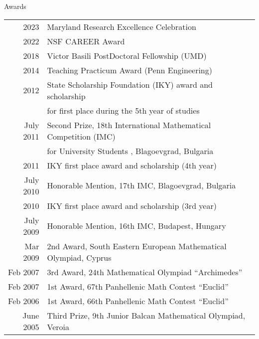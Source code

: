 \documentclass{resume} %
\begin{document}
\begin{rSection}{Awards}

  \begin{longtable}{rl}
  2023 & Maryland Research Excellence Celebration\\
  2022 & NSF CAREER Award \\
  2018 & Victor Basili PostDoctoral Fellowship (UMD)\\
  2014	 & Teaching Practicum Award (Penn Engineering) \\
  2012 & State Scholarship Foundation (IKY) award and scholarship \\
       & for first place during the 5th year of studies \\
  July  2011  &  Second  Prize,  18th  International Mathematical Competition (IMC) \\
  &  for University Students , Blagoevgrad, Bulgaria \\
  2011 & IKY first place award and scholarship (4th year)\\
  July 2010 &  Honorable Mention,  17th IMC, Blagoevgrad, Bulgaria \\
  2010 & IKY first place award and scholarship (3rd year)\\
  July 2009 &  Honorable Mention,  16th IMC, Budapest, Hungary\\
  Mar 2009  &  2nd Award, South Eastern European Mathematical Olympiad, Cyprus\\

  Feb 2007 &  3rd Award, 24th Mathematical Olympiad “Archimedes”\\
  Feb 2007 &  1st Award, 67th Panhellenic Math Contest “Euclid”\\
  Feb 2006 &  1st Award, 66th Panhellenic Math Contest “Euclid”\\
  June 2005 &  Third Prize, 9th Junior Balcan Mathematical Olympiad, Veroia\\
  
\end{longtable}

\end{rSection}
\end{document}
